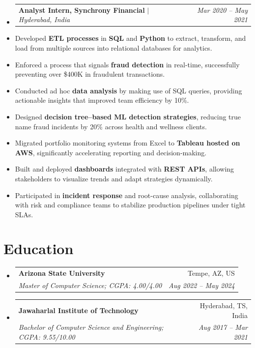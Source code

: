 \documentclass[a4paper,10pt]{article}
\makeatletter
\newcommand{\resumeSubheading}[4]{
  \vspace{-1pt}\item
    \begin{tabular*}{\linewidth}{l@{\extracolsep{\fill}}r}
      \textbf{#1} $|$ \textit{#2} & \textit{#4} \\
    \end{tabular*}\vspace{-4pt}
}
\newcommand{\resumeEduHeading}[4]{
  \vspace{-1pt}\item
    \begin{tabular*}{\linewidth}{l@{\extracolsep{\fill}}r}
      \textbf{#1} & #2 \\
      \textit{#3} & \textit{#4} \\
    \end{tabular*}\vspace{-5pt}
}
\newcommand{\textbulletlight}{\raisebox{0.15ex}{\scalebox{0.6}{$\bullet$}}}
\newcommand{\resumeSubHeadingListStart}{\begin{itemize}[leftmargin=0pt, label={}, itemsep=0pt]}
\newcommand{\resumeSubHeadingListEnd}{\end{itemize}}
\makeatother
\begin{document}
\vspace{-2pt}
\begin{itemize}[leftmargin=0pt, rightmargin=0pt, label={}, itemsep=0pt]
    \resumeSubheading{Analyst Intern, Synchrony Financial}{Hyderabad, India}
    {}{Mar 2020 -- May 2021}
\end{itemize}\vspace{-6pt}
\begin{itemize}[leftmargin=12pt, rightmargin=0pt, label={\textbulletlight}, itemsep=0pt, topsep=2pt]
        \item \small Developed \textbf{ETL processes} in \textbf{SQL} and \textbf{Python} to extract, transform, and load from multiple sources into relational databases for analytics.
        \item Enforced a process that signals \textbf{fraud detection} in real-time, successfully preventing over \$400K in fraudulent transactions.
        \item Conducted ad hoc \textbf{data analysis} by making use of SQL queries, providing actionable insights that improved team efficiency by 10\%.
        \item Designed \textbf{decision tree--based ML detection strategies}, reducing true name fraud incidents by 20\% across health and wellness clients.
        \item Migrated portfolio monitoring systems from Excel to \textbf{Tableau hosted on AWS}, significantly accelerating reporting and decision-making.
        \item Built and deployed \textbf{dashboards} integrated with \textbf{REST APIs}, allowing stakeholders to visualize trends and adapt strategies dynamically.
        \item Participated in \textbf{incident response} and root-cause analysis, collaborating with risk and compliance teams to stabilize production pipelines under tight SLAs.
\end{itemize}

\vspace{3pt}
\section{Education}
\resumeSubHeadingListStart
    \resumeEduHeading
      {Arizona State University}{Tempe, AZ, US}
      {Master of Computer Science; CGPA: 4.00/4.00}{Aug 2022 -- May 2024}
      \vspace{3pt}
    \resumeEduHeading
      {Jawaharlal Institute of Technology}{Hyderabad, TS, India}
      {Bachelor of Computer Science and Engineering; CGPA: 9.55/10.00}{Aug 2017 -- Mar 2021}
\resumeSubHeadingListEnd
\end{document}

